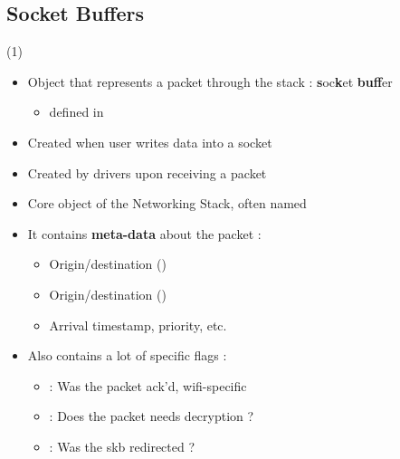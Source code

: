 \subsection{Socket Buffers}

\begin{frame}{ (1)}
	\begin{itemize}
		\item Object that represents a packet through the stack : \textbf{s}oc\textbf{k}et \textbf{buff}er
			\begin{itemize}
				\item {} defined in 
			\end{itemize}
		\item Created when user writes data into a socket
		\item Created by drivers upon receiving a packet
		\item Core object of the Networking Stack, often named 
		\item It contains \textbf{meta-data} about the packet :
			\begin{itemize}
				\item Origin/destination  ()
				\item Origin/destination  ()
				\item Arrival timestamp, priority, etc.
			\end{itemize}
		\item Also contains a lot of specific flags :
			\begin{itemize}
				\item {} : Was the packet ack'd, wifi-specific
				\item {} : Does the packet needs decryption ?
				\item {} : Was the skb redirected ?
			\end{itemize}
	\end{itemize}
\end{frame}

